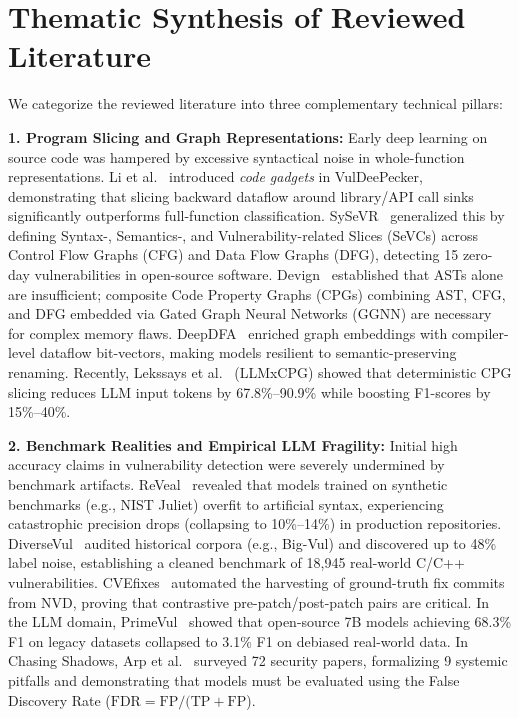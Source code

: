 \documentclass[10pt,twocolumn]{article}
\begin{document}
\section{Thematic Synthesis of Reviewed Literature}
We categorize the reviewed literature into three complementary technical pillars:

\vspace{2pt}\noindent\textbf{1. Program Slicing and Graph Representations:}
Early deep learning on source code was hampered by excessive syntactical noise in whole-function representations. Li et al.~\cite{li2018vuldeepecker} introduced \textit{code gadgets} in VulDeePecker, demonstrating that slicing backward dataflow around library/API call sinks significantly outperforms full-function classification. SySeVR~\cite{li2021sysevr} generalized this by defining Syntax-, Semantics-, and Vulnerability-related Slices (SeVCs) across Control Flow Graphs (CFG) and Data Flow Graphs (DFG), detecting 15 zero-day vulnerabilities in open-source software. Devign~\cite{zhou2019devign} established that ASTs alone are insufficient; composite Code Property Graphs (CPGs) combining AST, CFG, and DFG embedded via Gated Graph Neural Networks (GGNN) are necessary for complex memory flaws. DeepDFA~\cite{steenhoek2024deepdfa} enriched graph embeddings with compiler-level dataflow bit-vectors, making models resilient to semantic-preserving renaming. Recently, Lekssays et al.~\cite{lekssays2025llmxcpg} (LLMxCPG) showed that deterministic CPG slicing reduces LLM input tokens by 67.8\%--90.9\% while boosting F1-scores by 15\%--40\%.

\vspace{2pt}\noindent\textbf{2. Benchmark Realities and Empirical LLM Fragility:}
Initial high accuracy claims in vulnerability detection were severely undermined by benchmark artifacts. ReVeal~\cite{chakraborty2021reveal} revealed that models trained on synthetic benchmarks (e.g., NIST Juliet) overfit to artificial syntax, experiencing catastrophic precision drops (collapsing to 10\%--14\%) in production repositories. DiverseVul~\cite{chen2023diversevul} audited historical corpora (e.g., Big-Vul) and discovered up to 48\% label noise, establishing a cleaned benchmark of 18,945 real-world C/C++ vulnerabilities. CVEfixes~\cite{bhandari2021cvefixes} automated the harvesting of ground-truth fix commits from NVD, proving that contrastive pre-patch/post-patch pairs are critical. In the LLM domain, PrimeVul~\cite{zhang2025howfar} showed that open-source 7B models achieving 68.3\% F1 on legacy datasets collapsed to 3.1\% F1 on debiased real-world data. In Chasing Shadows, Arp et al.~\cite{arp2026chasingshadows} surveyed 72 security papers, formalizing 9 systemic pitfalls and demonstrating that models must be evaluated using the False Discovery Rate ($\text{FDR} = \text{FP}/(\text{TP} + \text{FP}$).
\end{document}
